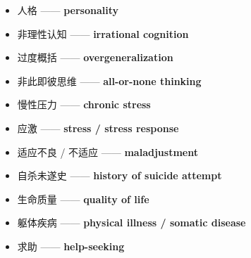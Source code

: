 \documentclass[
  chinese,
  9pt,
  a4paper,
]{ctexart}
\begin{document}
\begin{itemize}
\item
  人格 ------ \textbf{personality}
\item
  非理性认知 ------ \textbf{irrational cognition}
\item
  过度概括 ------ \textbf{overgeneralization}
\item
  非此即彼思维 ------ \textbf{all-or-none thinking}
\item
  慢性压力 ------ \textbf{chronic stress}
\item
  应激 ------ \textbf{stress / stress response}
\item
  适应不良 / 不适应 ------ \textbf{maladjustment}
\item
  自杀未遂史 ------ \textbf{history of suicide attempt}
\item
  生命质量 ------ \textbf{quality of life}
\item
  躯体疾病 ------ \textbf{physical illness / somatic disease}
\item
  求助 ------ \textbf{help-seeking}
\end{itemize}
\end{document}
